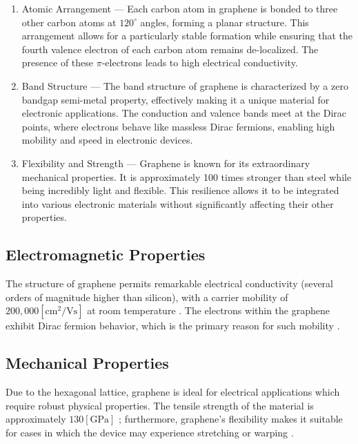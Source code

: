 \documentclass[conference]{IEEEtran}
\begin{document}
\begin{enumerate}

  \item Atomic Arrangement — Each carbon atom in graphene is bonded to three other carbon atoms at $120^{\circ}$ angles, forming a planar structure. This arrangement allows for a particularly stable formation while ensuring that the fourth valence electron of each carbon atom remains de-localized. The presence of these $\pi$-electrons leads to high electrical conductivity.

  \item Band Structure — The band structure of graphene is characterized by a zero bandgap semi-metal property, effectively making it a unique material for electronic applications. The conduction and valence bands meet at the Dirac points, where electrons behave like massless Dirac fermions, enabling high mobility and speed in electronic devices.

  \item Flexibility and Strength — Graphene is known for its extraordinary mechanical properties. It is approximately 100 times stronger than steel while being incredibly light and flexible. This resilience allows it to be integrated into various electronic materials without significantly affecting their other properties.

\end{enumerate}

\subsection{Electromagnetic Properties}

The structure of graphene permits remarkable electrical conductivity (several orders of magnitude higher than silicon), with a carrier mobility of $200,000\left[ \si{\cm\squared\per\volt\second} \right]$ at room temperature \cite{mb3}. The electrons within the graphene exhibit Dirac fermion behavior, which is the primary reason for such mobility \cite{mb4}.

\subsection{Mechanical Properties}

Due to the hexagonal lattice, graphene is ideal for electrical applications which require robust physical properties. The tensile strength of the material is approximately $130[\si{\giga\pascal}]$ \cite{mb5}; furthermore, graphene's flexibility makes it suitable for cases in which the device may experience stretching or warping \cite{mb6}.
\end{document}

